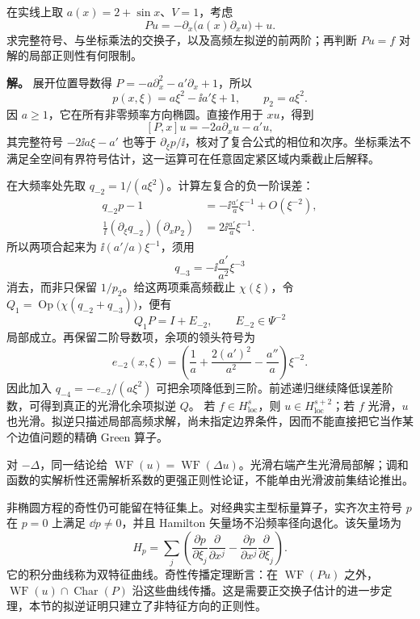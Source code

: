 \begin{exbox}
在实线上取 $a(x)=2+\sin x$、$V=1$，考虑
\[
Pu=-\partial_x\bigl(a(x)\partial_xu\bigr)+u.
\]
求完整符号、与坐标乘法的交换子，以及高频左拟逆的前两阶；再判断 $Pu=f$ 对解的局部正则性有何限制。

\textbf{解。} 展开位置导数得 $P=-a\partial_x^2-a'\partial_x+1$，所以
\[
p(x,\xi)=a\xi^2-\ii a'\xi+1,
\qquad p_2=a\xi^2.
\]
因 $a\ge1$，它在所有非零频率方向椭圆。直接作用于 $xu$，得到
\[
[P,x]u=-2a\partial_xu-a'u,
\]
其完整符号 $-2\ii a\xi-a'$ 也等于 $\partial_\xi p/\ii$，核对了复合公式的相位和次序。坐标乘法不满足全空间有界符号估计，这一运算可在任意固定紧区域内乘截止后解释。

在大频率处先取 $q_{-2}=1/(a\xi^2)$。计算左复合的负一阶误差：
\begin{align*}
q_{-2}p-1&=-\ii\frac{a'}a\xi^{-1}+O(\xi^{-2}),\\
\frac1\ii(\partial_\xi q_{-2})(\partial_xp_2)
&=2\ii\frac{a'}a\xi^{-1}.
\end{align*}
所以两项合起来为 $\ii(a'/a)\xi^{-1}$，须用
\[
q_{-3}=-\ii\frac{a'}{a^2}\xi^{-3}
\]
消去，而非只保留 $1/p_2$。给这两项乘高频截止 $\chi(\xi)$，令 $Q_1=\operatorname{Op}\bigl(\chi(q_{-2}+q_{-3})\bigr)$，便有
\[
Q_1P=I+E_{-2},\qquad E_{-2}\in\Psi^{-2}
\]
局部成立。再保留二阶导数项，余项的领头符号为
\[
e_{-2}(x,\xi)=\left(\frac1a+\frac{2(a')^2}{a^2}-\frac{a''}a\right)\xi^{-2}.
\]
因此加入 $q_{-4}=-e_{-2}/(a\xi^2)$ 可把余项降低到三阶。前述递归继续降低误差阶数，可得到真正的光滑化余项拟逆 $Q$。
若 $f\in H^s_{\mathrm{loc}}$，则 $u\in H^{s+2}_{\mathrm{loc}}$；若 $f$ 光滑，$u$ 也光滑。拟逆只描述局部高频求解，尚未指定边界条件，因而不能直接把它当作某个边值问题的精确 Green 算子。
\end{exbox}

对 $-\Delta$，同一结论给 $\operatorname{WF}(u)=\operatorname{WF}(\Delta u)$。光滑右端产生光滑局部解；调和函数的实解析性还需解析系数的更强正则性论证，不能单由光滑波前集结论推出。

非椭圆方程的奇性仍可能留在特征集上。对经典实主型标量算子，实齐次主符号 $p$ 在 $p=0$ 上满足 $\dd p\ne0$，并且 Hamilton 矢量场不沿频率径向退化。该矢量场为
\[
H_p=\sum_j\left(
\frac{\partial p}{\partial\xi_j}\frac{\partial}{\partial x^j}
-\frac{\partial p}{\partial x^j}\frac{\partial}{\partial\xi_j}\right).
\]
它的积分曲线称为双特征曲线。奇性传播定理断言：在 $\operatorname{WF}(Pu)$ 之外，$\operatorname{WF}(u)\cap\operatorname{Char}(P)$ 沿这些曲线传播。这是需要正交换子估计的进一步定理，本节的拟逆证明只建立了非特征方向的正则性。

